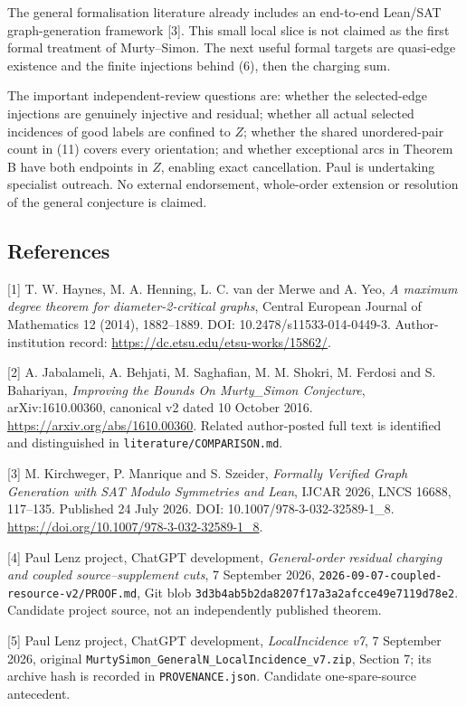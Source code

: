 \documentclass[
  11pt,
  a4paper,
]{article}
\begin{document}
The general formalisation literature already includes an end-to-end
Lean/SAT graph-generation framework {[}3{]}. This small local slice is
not claimed as the first formal treatment of Murty--Simon. The next
useful formal targets are quasi-edge existence and the finite injections
behind (6), then the charging sum.

The important independent-review questions are: whether the
selected-edge injections are genuinely injective and residual; whether
all actual selected incidences of good labels are confined to \(Z\);
whether the shared unordered-pair count in (11) covers every
orientation; and whether exceptional arcs in Theorem B have both
endpoints in \(Z\), enabling exact cancellation. Paul is undertaking
specialist outreach. No external endorsement, whole-order extension or
resolution of the general conjecture is claimed.

\subsection{References}\label{references}

{[}1{]} T. W. Haynes, M. A. Henning, L. C. van der Merwe and A. Yeo,
\emph{A maximum degree theorem for diameter-2-critical graphs}, Central
European Journal of Mathematics 12 (2014), 1882--1889. DOI:
10.2478/s11533-014-0449-3. Author-institution record:
\url{https://dc.etsu.edu/etsu-works/15862/}.

{[}2{]} A. Jabalameli, A. Behjati, M. Saghafian, M. M. Shokri, M.
Ferdosi and S. Bahariyan, \emph{Improving the Bounds On Murty\_Simon
Conjecture}, arXiv:1610.00360, canonical v2 dated 10 October 2016.
\url{https://arxiv.org/abs/1610.00360}. Related author-posted full text
is identified and distinguished in \texttt{literature/COMPARISON.md}.

{[}3{]} M. Kirchweger, P. Manrique and S. Szeider, \emph{Formally
Verified Graph Generation with SAT Modulo Symmetries and Lean}, IJCAR
2026, LNCS 16688, 117--135. Published 24 July 2026. DOI:
10.1007/978-3-032-32589-1\_8.
\url{https://doi.org/10.1007/978-3-032-32589-1_8}.

{[}4{]} Paul Lenz project, ChatGPT development, \emph{General-order
residual charging and coupled source--supplement cuts}, 7 September
2026, \texttt{2026-09-07-coupled-resource-v2/PROOF.md}, Git blob
\texttt{3d3b4ab5b2da8207f17a3a2afcce49e7119d78e2}. Candidate project
source, not an independently published theorem.

{[}5{]} Paul Lenz project, ChatGPT development, \emph{LocalIncidence
v7}, 7 September 2026, original
\texttt{MurtySimon\_GeneralN\_LocalIncidence\_v7.zip}, Section 7; its
archive hash is recorded in \texttt{PROVENANCE.json}. Candidate
one-spare-source antecedent.
\end{document}
